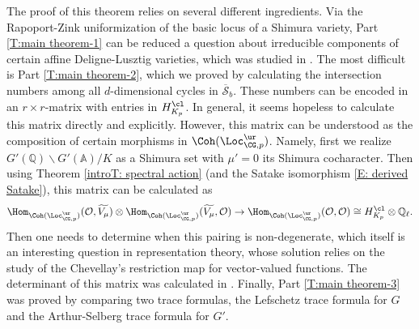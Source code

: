 \documentclass[11pt]{amsart}
\theoremstyle{definition}
\theoremstyle{definition}
\theoremstyle{definition}
\numberwithin{equation}{section}
\newcommand{\bA}{{\mathbb A}}
\newcommand{\bQ}{{\mathbb Q}}
\newcommand{\mO}{{\mathcal O}}
\newcommand{\scrS}{{\mathscr S}}
\begin{document}
The proof of this theorem relies on several different ingredients. Via the Rapoport-Zink uniformization of the basic locus of a Shimura variety, Part \eqref{T:main theorem-1} can be reduced a question about irreducible components of certain affine Deligne-Lusztig varieties, which was studied in \cite[\S 3]{Xiao-Zhu-Cycle}.
The most difficult is Part \eqref{T:main theorem-2}, which we proved by calculating the intersection numbers among all $d$-dimensional cycles in $\overline\scrS_b$. These numbers  can be encoded in an $r\times r$-matrix with entries in $H^{\cl}_{K_p}$. In general, it seems hopeless to calculate this matrix directly and explicitly. 
However, this matrix can be understood as the composition of certain morphisms in $\Coh(\Loc_{\CG,p}^{\ur})$. Namely, first we realize $G'(\bQ)\backslash G'(\bA)/K$ as a Shimura set with $\mu'=0$ its Shimura cocharacter.
Then using Theorem \ref{introT: spectral action} (and the Satake isomorphism \eqref{E: derived Satake}), this matrix can be calculated as
\[ 
\Hom_{\Coh(\Loc_{\CG,p}^{\ur})}(\mO,\widetilde{V_{\mu}})\otimes  \Hom_{\Coh(\Loc_{\CG,p}^{\ur})}(\widetilde{V_{\mu}},\mO)\to  \Hom_{\Coh(\Loc_{\CG,p}^{\ur})}(\mO,\mO)\cong H^{\cl}_{K_p}\otimes\bQ_\ell.
\]
Then one needs to determine when this pairing is non-degenerate, which itself is an interesting question in representation theory, whose solution relies on the study of the Chevellay's restriction map for vector-valued functions. The determinant of this matrix was calculated in \cite{Xiao-Zhu-Invariants}. Finally, Part \eqref{T:main theorem-3} was proved by comparing two trace formulas, the Lefschetz trace formula for $G$ and the Arthur-Selberg trace formula for $G'$. 
\end{document}
